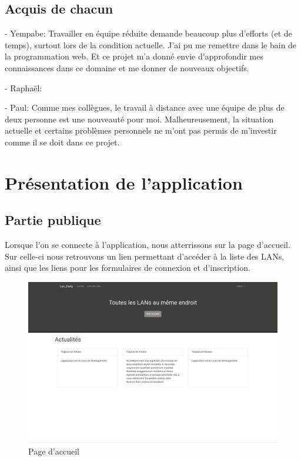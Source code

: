 \documentclass[12pt]{article}
\begin{document}
\subsection{Acquis de chacun}
- Yempabe: Travailler en équipe réduite demande beaucoup plus d'efforts (et de temps), surtout lors de la condition actuelle. J'ai pu me remettre dans le bain de la programmation web. Et ce projet m'a donné envie d'approfondir mes connaissances dans ce domaine et me donner de nouveaux objectifs.

- Raphaël:

- Paul: Comme mes collègues, le travail à distance avec une équipe de plus de deux personne est une nouveauté pour moi. Malheureusement, la situation actuelle et certains problèmes personnels ne m'ont pas permis de m'investir comme il se doit dans ce projet.
\newpage

\section{Présentation de l'application}

\subsection{Partie publique}
Lorsque l'on se connecte à l'application, nous atterrissons sur la page d'accueil. Sur celle-ci nous retrouvons un lien permettant d'accéder à la liste des LANs, ainsi que les liens pour les formulaires de connexion et d'inscription.

\begin{figure}[H]
\centering
\includegraphics[scale=0.20]{images/accueil.png}
\caption{Page d'accueil}
\label{}
\end{figure}
\end{document}
